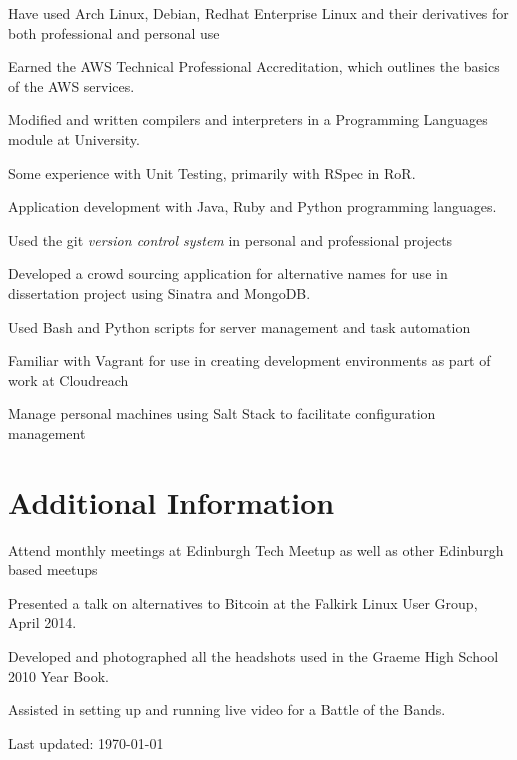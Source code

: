 \documentclass[11pt,a4paper]{article}
\renewenvironment{itemize}{
  \begin{list}{}{
    \setlength{\leftmargin}{1em}
    \setlength{\itemsep}{0.25em}
    \setlength{\parskip}{0pt}
    \setlength{\parsep}{0.25em}
    \renewcommand{\labelitemi}{$\bullet$}
  }
}{
  \end{list}
}
\begin{document}
\begin{itemize}
    \item Have used Arch Linux, Debian, Redhat Enterprise Linux and their derivatives for both professional and personal use
    \item Earned the AWS Technical Professional Accreditation, which outlines the basics of the AWS services.
    \item Modified and written compilers and interpreters in a Programming Languages module at University.
    \item Some experience with Unit Testing, primarily with RSpec in RoR.
    \item Application development with Java, Ruby and Python programming languages.
    \item Used the git \emph{version control system} in personal and professional projects
    \item Developed a crowd sourcing application for alternative names for use in dissertation project using Sinatra and MongoDB.
    \item Used Bash and Python scripts for server management and task automation
    \item Familiar with Vagrant for use in creating development environments as part of work at Cloudreach
    \item Manage personal machines using Salt Stack to facilitate configuration management
\end{itemize}

\section*{Additional Information}

\begin{itemize}
    \item Attend monthly meetings at Edinburgh Tech Meetup as well as other Edinburgh based meetups
    \item Presented a talk on alternatives to Bitcoin at the Falkirk
        Linux User Group, April 2014.
    \item Developed and photographed all the headshots used in the Graeme High
        School 2010 Year Book.
    \item Assisted in setting up and running live video for a Battle of
        the Bands.
\end{itemize}


\medskip
\begin{center}
  \begin{small}
    Last updated: \today
  \end{small}
\end{center}
\end{document}
